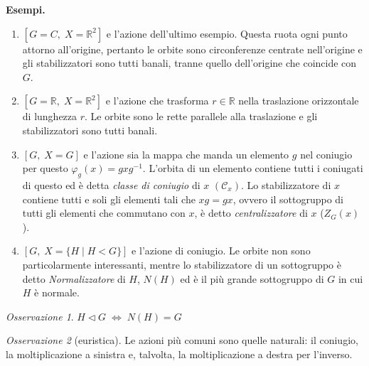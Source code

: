 \documentclass[a4paper]{article}
\theoremstyle{remark}
\newtheorem*{remark}{Osservazione}
\theoremstyle{definition}
\begin{document}
\begin{multicols}{2}
\textbf{Esempi.}
\begin{enumerate}
	\item $ [G = C,\; X = \mathbb{R}^2 ] $ e l'azione dell'ultimo esempio. Questa ruota ogni punto attorno all'origine, pertanto le orbite sono circonferenze centrate nell'origine e gli stabilizzatori sono tutti banali, tranne quello dell'origine che coincide con $ G $.
	\item $ [G = \mathbb{R},\; X = \mathbb{R}^2 ] $ e l'azione che trasforma $ r \in \mathbb{R} $ nella traslazione orizzontale di lunghezza $ r $. Le orbite sono le rette parallele alla traslazione e gli stabilizzatori sono tutti banali.
	\item $ [G,\; X = G ] $ e l'azione sia la mappa che manda un elemento $ g $ nel coniugio per questo $ \varphi_g(x) = gxg^{-1} $. L'orbita di un elemento contiene tutti i coniugati di questo ed è detta \emph{classe di coniugio} di $ x $ $ (\mathcal{C}_x) $. Lo stabilizzatore di $ x $ contiene tutti e soli gli elementi tali che $ xg = gx $, ovvero il sottogruppo di tutti gli elementi che commutano con $ x $, è detto \emph{centralizzatore} di $ x $ ($ Z_G(x) $).
	\item $ [G,\; X = \{ H \mid H < G \} ] $ e l'azione di coniugio. Le orbite non sono particolarmente interessanti, mentre lo stabilizzatore di un sottogruppo è detto \emph{Normalizzatore} di $ H $, $ N(H) $ ed è il più grande sottogruppo di $ G $ in cui $ H $ è normale.
\end{enumerate}
\begin{remark}
	$ H \lhd G \;\Leftrightarrow\; N(H) = G $
\end{remark}
\begin{remark}[euristica]
	Le azioni più comuni sono quelle naturali: il coniugio, la moltiplicazione a sinistra e, talvolta, la moltiplicazione a destra per l'inverso.
\end{remark}
\end{multicols}
\end{document}
